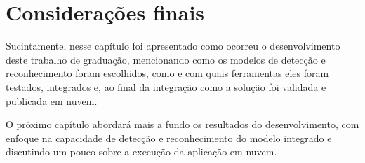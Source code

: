 \section{Considerações finais}
Sucintamente, nesse capítulo foi apresentado como ocorreu o desenvolvimento deste trabalho de graduação, mencionando como os modelos de detecção e 
reconhecimento foram escolhidos, como e com quais ferramentas eles foram testados, integrados e, ao final da integração como a solução foi validada 
e publicada em nuvem.

O próximo capítulo abordará mais a fundo os resultados do desenvolvimento, com enfoque na capacidade de detecção e reconhecimento do modelo integrado 
e discutindo um pouco sobre a execução da aplicação em nuvem.
